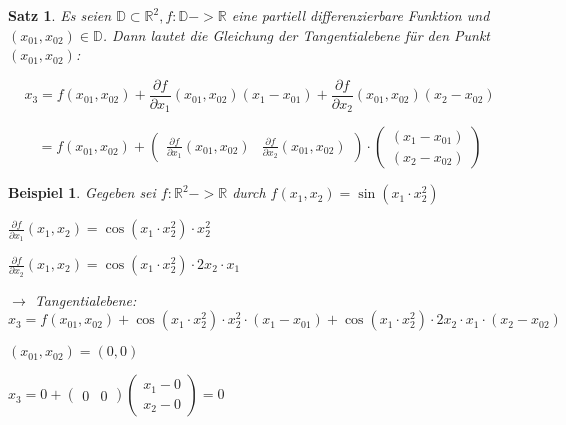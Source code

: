 \documentclass[12pt,a4paper]{scrreprt}
\newtheorem{beispiel}[defi]{Beispiel}
\newtheorem{satz}[defi]{Satz}
\begin{document}
\begin{satz}
Es seien $\mathbb{D} \subset \mathbb{R}^2, f:\mathbb{D}->\mathbb{R}$ eine partiell differenzierbare Funktion und $(x_{01},x_{02})\in\mathbb{D}$. Dann lautet die Gleichung der Tangentialebene für den Punkt $(x_{01},x_{02})$:

\[x_3=f(x_{01},x_{02})+\frac{\partial f}{\partial x_1}(x_{01},x_{02})(x_1-x_{01})+\frac{\partial f}{\partial x_2}(x_{01},x_{02})(x_2-x_{02})\]

\[=f(x_{01},x_{02})+\begin{pmatrix} \frac{\partial f}{\partial x_1} (x_{01},x_{02}) & \frac{\partial f}{\partial x_2}(x_{01},x_{02}) \end{pmatrix} \cdot \begin{pmatrix} (x_1-x_{01})\\ (x_2-x_{02}) \end{pmatrix}\]
\end{satz}

\begin{beispiel}
	Gegeben sei $f:\mathbb{R}^2->\mathbb{R}$ durch $f(x_1,x_2)=\sin(x_1\cdot x_2^2)$

	$\frac{\partial f}{\partial x_1}(x_1,x_2)=\cos(x_1\cdot x_2^2)\cdot x_2^2$
	
	$\frac{\partial f}{\partial x_2}(x_1,x_2)=\cos(x_1\cdot x_2^2)\cdot 2x_2 \cdot x_1$
	
	$\to$ Tangentialebene: $x_3 = f(x_{01},x_{02}) + \cos(x_1\cdot x_2^2)\cdot x_2^2 \cdot (x_1 - x_{01}) + \cos(x_1\cdot x_2^2)\cdot 2x_2 \cdot x_1 \cdot (x_2 - x_{02})$
	
	$(x_{01},x_{02}) = (0,0)$
	
	$x_3 = 0 + \begin{pmatrix}0 & 0\end{pmatrix} \begin{pmatrix}x_1 - 0 \\ x_2 - 0\end{pmatrix} = 0$
	
\end{beispiel}
\end{document}
